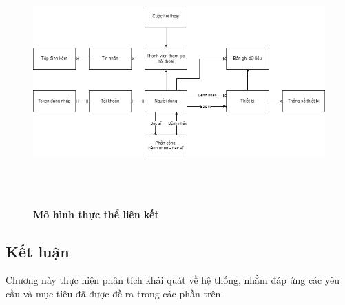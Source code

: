\begin{figure}[H]
  \centering
  \includegraphics[width=15cm,height=9.5cm]{Images/system/fmECG_connection_entity.png}
  \caption[Mô hình thực thể liên kết]{\bfseries \fontsize{12pt}{0pt}
  \selectfont Mô hình thực thể liên kết}
  \label{ttlk} %
\end{figure}

\subsection{Kết luận}

Chương này thực hiện phân tích khái quát về
 hệ thống, nhằm đáp ứng các yêu cầu và mục tiêu đã được đề ra trong các phần trên.

\newpage
